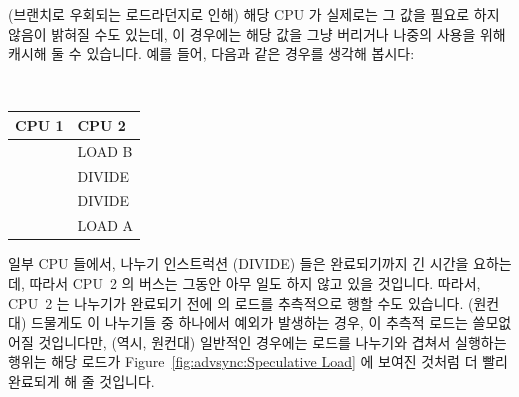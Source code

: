 \begin{enumerate}
(브랜치로 우회되는 로드라던지로 인해) 해당 CPU 가 실제로는 그 값을 필요로 하지
않음이 밝혀질 수도 있는데, 이 경우에는 해당 값을 그냥 버리거나 나중의 사용을
위해 캐시해 둘 수 있습니다.
예를 들어, 다음과 같은 경우를 생각해 봅시다:

\vspace{5pt}
\begin{minipage}[t]{\columnwidth}
\tt
\scriptsize
\begin{tabular}{l|p{1.5in}}
	CPU 1 &		CPU 2 \\
	\hline
		&	LOAD B \\
		&	DIVIDE \\
		&	DIVIDE \\
		&	LOAD A \\
\end{tabular}
\end{minipage}
\vspace{5pt}

일부 CPU 들에서, 나누기 인스트럭션 (DIVIDE) 들은 완료되기까지 긴 시간을
요하는데, 따라서 CPU~2 의 버스는 그동안 아무 일도 하지 않고 있을 것입니다.
따라서, CPU~2 는 나누기가 완료되기 전에  의 로드를 추측적으로 행할 수도
있습니다.
(원컨대) 드물게도 이 나누기들 중 하나에서 예외가 발생하는 경우, 이 추측적
로드는 쓸모없어질 것입니다만, (역시, 원컨대) 일반적인 경우에는 로드를 나누기와
겹쳐서 실행하는 행위는 해당 로드가 Figure~\ref{fig:advsync:Speculative Load} 에
보여진 것처럼 더 빨리 완료되게 해 줄 것입니다.

\end{enumerate}
